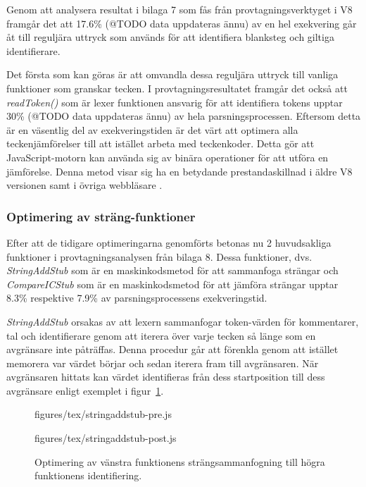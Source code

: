 Genom att analysera resultat i bilaga 7 som fås från provtagningsverktyget i
V8 framgår det att 17.6\% (@TODO data uppdateras ännu) av en hel exekvering
går åt till reguljära uttryck som används för att identifiera blanksteg och
giltiga identifierare.

Det första som kan göras är att omvandla dessa reguljära uttryck till vanliga
funktioner som granskar tecken. I provtagningsresultatet framgår det också att
\textit{readToken()} som är lexer funktionen ansvarig för att identifiera
tokens upptar 30\% (@TODO data uppdateras ännu)  av hela parsningsprocessen.
Eftersom detta är en väsentlig del av exekveringstiden är det värt att
optimera alla teckenjämförelser till att istället arbeta med teckenkoder.
Detta gör att JavaScript-motorn kan använda sig av binära operationer för att
utföra en jämförelse. Denna metod visar sig ha en betydande prestandaskillnad
i äldre V8 versionen samt i övriga webbläsare \citep{charcodeat}.

\subsubsection{Optimering av sträng-funktioner}

Efter att de tidigare optimeringarna genomförts betonas nu 2 huvudsakliga
funktioner i provtagningsanalysen från bilaga 8. Dessa funktioner, dvs.
\textit{StringAddStub} som är en maskinkodsmetod för att sammanfoga strängar
och \textit{CompareICStub} som är en maskinkodsmetod för att jämföra strängar
upptar 8.3\% respektive 7.9\% av parsningsprocessens exekveringstid.

\textit{StringAddStub} orsakas av att lexern sammanfogar token-värden för
kommentarer, tal och identifierare genom att iterera över varje tecken så
länge som en avgränsare inte påträffas. Denna procedur går att förenkla genom
att istället memorera var värdet börjar och sedan iterera fram till
avgränsaren. När avgränsaren hittats kan värdet identifieras från dess
startposition till dess avgränsare enligt exemplet i figur~\ref{fig:stringAddStub}.

\begin{figure}[ht]
  \begin{minipage}[t]{0.5\textwidth}
      {figures/tex/stringaddstub-pre.js}
  \end{minipage}%
  \begin{minipage}[t]{0.5\textwidth}
      {figures/tex/stringaddstub-post.js}
  \end{minipage}
  \caption{Optimering av vänstra funktionens strängsammanfogning till högra
    funktionens identifiering.}
  \label{fig:stringAddStub}
\end{figure}

